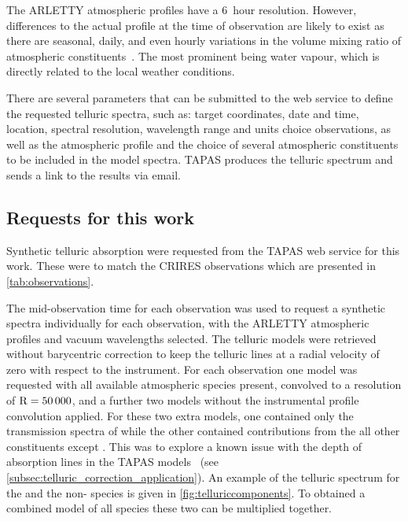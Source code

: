 The {ARLETTY} atmospheric profiles have a 6~hour resolution.
However, differences to the actual profile at the time of observation are likely to exist as there are seasonal, daily, and even hourly variations in the volume mixing ratio of atmospheric constituents~\citep[e.g.][]{ramanathan_daily_1953, thoning_atmospheric_1989, schneising_three_2009}.
The most prominent being water vapour, which is directly related to the local weather conditions.

There are several parameters that can be submitted to the web service to define the requested telluric spectra, such as: target coordinates, date and time, location, spectral resolution, wavelength range and units choice observations, as well as the atmospheric profile and the choice of several atmospheric constituents to be included in the model spectra.
{TAPAS} produces the telluric spectrum and sends a link to the results via email.


\subsection{Requests for this work}
Synthetic telluric absorption were requested from the {TAPAS} web service for this work.
These were to match the {CRIRES} observations which are presented in \cref{tab:observations}.

The mid-observation time for each observation was used to request a synthetic spectra individually for each observation, with the {ARLETTY} atmospheric profiles and vacuum wavelengths selected.
The telluric models were retrieved without barycentric correction to keep the telluric lines at a radial velocity of zero with respect to the instrument.
For each observation one model was requested with all available atmospheric species present, convolved to a resolution of \(\rm R=50\,000\), and a further two models without the instrumental profile convolution applied.
For these two extra models, one contained only the transmission spectra of  while the other contained contributions from the all other constituents except .
This was to explore a known issue with the depth of  absorption lines in the {TAPAS} models~\citep{bertaux_tapas_2014} (see \cref{subsec:telluric_correction_application}).
An example of the telluric spectrum for the  and the non- species is given in \cref{fig:telluriccomponents}.
To obtained a combined model of all species these two can be multiplied together.

